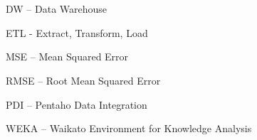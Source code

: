 \section*{} 

DW	–  	Data Warehouse

ETL - Extract, Transform, Load

MSE    –   Mean Squared Error

RMSE    –   Root Mean Squared Error

PDI	– 	Pentaho Data Integration 

WEKA	–	Waikato Environment for Knowledge Analysis